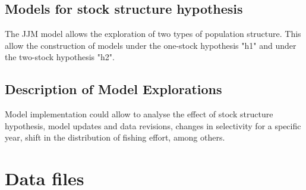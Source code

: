 \documentclass{article}
\begin{document}
\subsection{Models for stock structure hypothesis}

The JJM model allows the exploration of two types of population structure. This allow the construction of models under the one-stock hypothesis "h1" and under the two-stock hypothesis "h2".

\subsection{Description of Model Explorations}

Model implementation could allow to analyse the effect of stock structure hypothesis, model updates and data revisions, changes in selectivity for a specific year, shift in the distribution of fishing effort, among others. 



\section{Data files}
\end{document}
